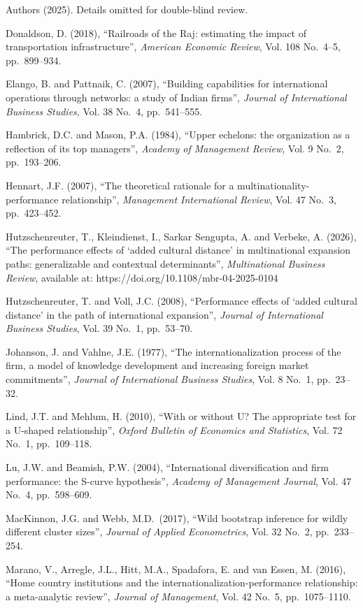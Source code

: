 \documentclass[
  12pt,a4paper]{article}
\begin{document}
Authors (2025). Details omitted for double-blind review.

Donaldson, D. (2018), ``Railroads of the Raj: estimating the impact of
transportation infrastructure'', \emph{American Economic Review}, Vol.
108 No.~4--5, pp.~899--934.

Elango, B. and Pattnaik, C. (2007), ``Building capabilities for
international operations through networks: a study of Indian firms'',
\emph{Journal of International Business Studies}, Vol. 38 No.~4,
pp.~541--555.

Hambrick, D.C. and Mason, P.A. (1984), ``Upper echelons: the
organization as a reflection of its top managers'', \emph{Academy of
Management Review}, Vol. 9 No.~2, pp.~193--206.

Hennart, J.F. (2007), ``The theoretical rationale for a
multinationality-performance relationship'', \emph{Management
International Review}, Vol. 47 No.~3, pp.~423--452.

Hutzschenreuter, T., Kleindienst, I., Sarkar Sengupta, A. and Verbeke,
A. (2026), ``The performance effects of `added cultural distance' in
multinational expansion paths: generalizable and contextual
determinants'', \emph{Multinational Business Review}, available at:
https://doi.org/10.1108/mbr-04-2025-0104

Hutzschenreuter, T. and Voll, J.C. (2008), ``Performance effects of
`added cultural distance' in the path of international expansion'',
\emph{Journal of International Business Studies}, Vol. 39 No.~1,
pp.~53--70.

Johanson, J. and Vahlne, J.E. (1977), ``The internationalization process
of the firm, a model of knowledge development and increasing foreign
market commitments'', \emph{Journal of International Business Studies},
Vol. 8 No.~1, pp.~23--32.

Lind, J.T. and Mehlum, H. (2010), ``With or without U? The appropriate
test for a U-shaped relationship'', \emph{Oxford Bulletin of Economics
and Statistics}, Vol. 72 No.~1, pp.~109--118.

Lu, J.W. and Beamish, P.W. (2004), ``International diversification and
firm performance: the S-curve hypothesis'', \emph{Academy of Management
Journal}, Vol. 47 No.~4, pp.~598--609.

MacKinnon, J.G. and Webb, M.D.~(2017), ``Wild bootstrap inference for
wildly different cluster sizes'', \emph{Journal of Applied
Econometrics}, Vol. 32 No.~2, pp.~233--254.

Marano, V., Arregle, J.L., Hitt, M.A., Spadafora, E. and van Essen, M.
(2016), ``Home country institutions and the
internationalization-performance relationship: a meta-analytic review'',
\emph{Journal of Management}, Vol. 42 No.~5, pp.~1075--1110.
\end{document}
